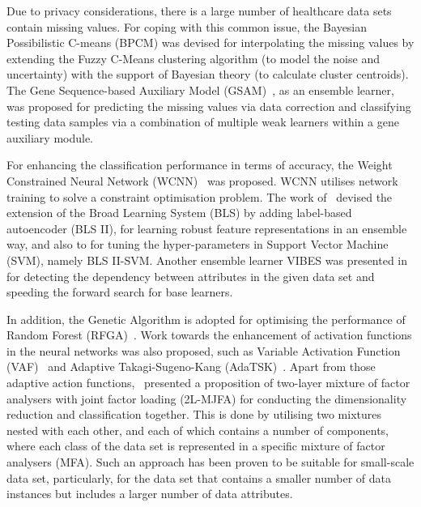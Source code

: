 \documentclass{article}
\newcommand*{\1}{\textcolor{red}}
\begin{document}
Due to privacy considerations, there is a large number of healthcare data sets contain missing values. For coping with this common issue, the Bayesian Possibilistic C-means (BPCM) \cite{li2019bayesian} was devised for interpolating the missing values by extending the Fuzzy C-Means clustering algorithm (to model the noise and uncertainty) with the support of Bayesian theory (to calculate cluster centroids). The Gene Sequence-based Auxiliary Model (GSAM)~\cite{lu2020machine}, as an ensemble learner, was proposed for predicting the missing values via data correction and classifying testing data samples via a combination of multiple weak learners within a gene auxiliary module.

For enhancing the classification performance in terms of accuracy, the Weight Constrained Neural Network (WCNN)~\cite{livieris2019improving} was proposed. WCNN utilises network training to solve a constraint optimisation problem. The work of~\cite{tang2019construction} devised the extension of the Broad Learning System (BLS) by adding label-based autoencoder (BLS II), for learning robust feature representations in an ensemble way, and also to for tuning the hyper-parameters in Support Vector Machine (SVM), namely BLS II-SVM. Another ensemble learner VIBES was presented in~\cite{aydin2019construction} for detecting the dependency between attributes in the given data set and speeding the forward search for base learners.

In addition, the Genetic Algorithm is adopted for optimising the performance of Random Forest (RFGA)~\cite{elyan2017genetic}. Work towards the enhancement of activation functions in the neural networks was also proposed, such as Variable Activation Function (VAF)~\cite{apicella2019simple} and Adaptive Takagi-Sugeno-Kang (AdaTSK)~\cite{8858838}. Apart from those adaptive action functions,~\cite{yang2018new} presented a proposition of two-layer mixture of factor analysers with joint factor loading (2L-MJFA) for conducting the dimensionality reduction and classification together. This is done by utilising two mixtures nested with each other, and each of which contains a number of components, where each class of the data set is represented in a specific mixture of factor analysers (MFA). Such an approach has been proven to be suitable for small-scale data set, particularly, for the data set that contains a smaller number of data instances but includes a larger number of data attributes.
\end{document}
